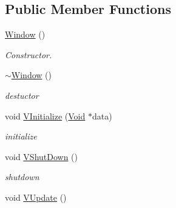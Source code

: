 \subsection*{Public Member Functions}
\begin{DoxyCompactItemize}
\item 
\hypertarget{classPlatform_1_1Window_1_1Linux_1_1Window_a7e0af528ebbcd7cb594500654cdad178}{
\hyperlink{classPlatform_1_1Window_1_1Linux_1_1Window_a7e0af528ebbcd7cb594500654cdad178}{Window} ()}
\label{classPlatform_1_1Window_1_1Linux_1_1Window_a7e0af528ebbcd7cb594500654cdad178}

\begin{DoxyCompactList}\small\item\em Constructor. \item\end{DoxyCompactList}\item 
\hypertarget{classPlatform_1_1Window_1_1Linux_1_1Window_acd721df4f37f266c84cff41e5399da25}{
\hyperlink{classPlatform_1_1Window_1_1Linux_1_1Window_acd721df4f37f266c84cff41e5399da25}{$\sim$Window} ()}
\label{classPlatform_1_1Window_1_1Linux_1_1Window_acd721df4f37f266c84cff41e5399da25}

\begin{DoxyCompactList}\small\item\em destuctor \item\end{DoxyCompactList}\item 
\hypertarget{classPlatform_1_1Window_1_1Linux_1_1Window_a082499ee781ffbd22229b2b617f7bc6c}{
void \hyperlink{classPlatform_1_1Window_1_1Linux_1_1Window_a082499ee781ffbd22229b2b617f7bc6c}{VInitialize} (\hyperlink{structVoid}{Void} $\ast$data)}
\label{classPlatform_1_1Window_1_1Linux_1_1Window_a082499ee781ffbd22229b2b617f7bc6c}

\begin{DoxyCompactList}\small\item\em initialize \item\end{DoxyCompactList}\item 
\hypertarget{classPlatform_1_1Window_1_1Linux_1_1Window_a8c93b723ea941e269960eea2fd14de33}{
void \hyperlink{classPlatform_1_1Window_1_1Linux_1_1Window_a8c93b723ea941e269960eea2fd14de33}{VShutDown} ()}
\label{classPlatform_1_1Window_1_1Linux_1_1Window_a8c93b723ea941e269960eea2fd14de33}

\begin{DoxyCompactList}\small\item\em shutdown \item\end{DoxyCompactList}\item 
\hypertarget{classPlatform_1_1Window_1_1Linux_1_1Window_a61c7bfdb7bb62efbd101a207865c98c7}{
void \hyperlink{classPlatform_1_1Window_1_1Linux_1_1Window_a61c7bfdb7bb62efbd101a207865c98c7}{VUpdate} ()}
\label{classPlatform_1_1Window_1_1Linux_1_1Window_a61c7bfdb7bb62efbd101a207865c98c7}


\end{DoxyCompactItemize}
